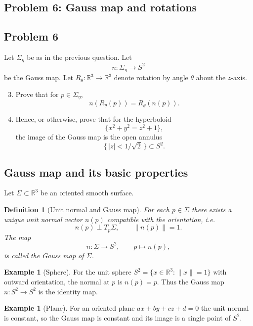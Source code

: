 \documentclass[12pt,a4paper]{article}
\theoremstyle{plain}
\newtheorem{definition}{Definition}
\theoremstyle{definition}      %
\newtheorem{example}[theorem]{Example}
\begin{document}
\bigskip

\subsection*{Problem 6: Gauss map and rotations}


\subsection*{Problem 6}

Let $\Sigma_\eta$ be as in the previous question. Let 
\[
n : \Sigma_\eta \to S^2
\]
be the Gauss map. Let $R_\theta : \mathbb{R}^3 \to \mathbb{R}^3$ denote
rotation by angle $\theta$ about the $z$-axis.

\begin{enumerate}[label=\textnormal{(\alph*)}]
	\setcounter{enumi}{2}
	\item Prove that for $p \in \Sigma_\eta$,
	\[
	n(R_\theta(p)) = R_\theta(n(p)).
	\]
	
	\item Hence, or otherwise, prove that for the hyperboloid
	\[
	\{x^2 + y^2 = z^2 + 1\},
	\]
	the image of the Gauss map is the open annulus
	\[
	\{\,|z| < 1/\sqrt{2}\,\} \subset S^2.
	\]
\end{enumerate}



\subsection*{Gauss map and its basic properties}

Let $\Sigma\subset \mathbb{R}^3$ be an oriented smooth surface.

\begin{definition}[Unit normal and Gauss map]
	For each $p\in\Sigma$ there exists a unique unit normal vector
	$n(p)$ compatible with the orientation, i.e.
	\[
	n(p)\perp T_p\Sigma,\qquad \|n(p)\|=1.
	\]
	The map
	\[
	n:\Sigma \longrightarrow S^2,\qquad p\longmapsto n(p),
	\]
	is called the \emph{Gauss map} of $\Sigma$.
\end{definition}

\begin{example}[Sphere]
	For the unit sphere $S^2=\{x\in\mathbb{R}^3:\|x\|=1\}$ with outward
	orientation, the normal at $p$ is $n(p)=p$. Thus the Gauss map
	$n:S^2\to S^2$ is the identity map.
\end{example}

\begin{example}[Plane]
	For an oriented plane $ax+by+cz+d=0$ the unit normal is constant, so
	the Gauss map is constant and its image is a single point of $S^2$.
\end{example}
\end{document}

